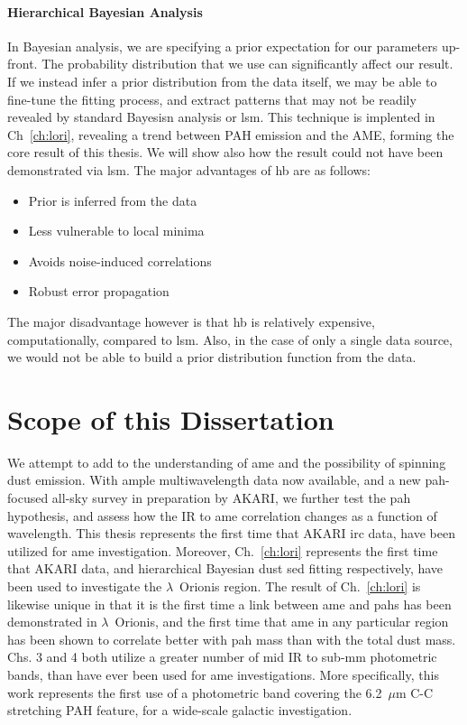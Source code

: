         \paragraph{Hierarchical Bayesian Analysis}
        In Bayesian analysis, we are specifying a prior expectation for our parameters up-front. The probability distribution that we use can significantly affect our result. If we instead infer a prior distribution from the data itself, we may be able to fine-tune the fitting process, and extract patterns that may not be readily revealed by standard Bayesisn analysis or \acrshort{lsm}. This technique is implented in Ch~\ref{ch:lori}, revealing a trend between PAH emission and the AME, forming the core result of this thesis. We will show also how the result could not have been demonstrated via \acrshort{lsm}. The major advantages of \acrshort{hb} are as follows:
            \begin{itemize}
                \item Prior is inferred from the data
                \item Less vulnerable to local minima
                \item Avoids noise-induced correlations
                \item Robust error propagation
            \end{itemize}
        The major disadvantage however is that \acrshort{hb} is relatively expensive, computationally, compared to \acrshort{lsm}. Also, in the case of only a single data source, we would not be able to build a prior distribution function from the data.

\section{Scope of this Dissertation}
    We attempt to add to the understanding of \acrshort{ame} and the possibility of spinning dust emission. With ample multiwavelength data now available, and a new \acrshort{pah}-focused all-sky survey in preparation by AKARI, we further test the \acrshort{pah} hypothesis, and assess how the IR to \acrshort{ame} correlation changes as a function of wavelength. This thesis represents the first time that AKARI \acrshort{irc} data, have been utilized for \acrshort{ame} investigation. Moreover, Ch.~\ref{ch:lori} represents the first time that AKARI data, and hierarchical Bayesian dust \acrshort{sed} fitting respectively, have been used to investigate the $\lambda$~Orionis region. The result of Ch.~\ref{ch:lori} is likewise unique in that it is the first time a link between \acrshort{ame} and \acrshort{pah}s has been demonstrated in $\lambda$~Orionis, and the first time that \acrshort{ame} in any particular region has been shown to correlate better with \acrshort{pah} mass than with the total dust mass. Chs. 3 and 4 both utilize a greater number of mid IR to sub-mm photometric bands, than have ever been used for \acrshort{ame} investigations. More specifically, this work represents the first use of a  photometric band covering the 6.2~$\mu$m C-C stretching PAH feature, for a wide-scale galactic investigation.

